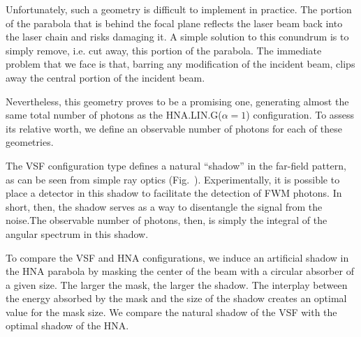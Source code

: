 \documentclass[11pt,SymmetricalJury]{inrsthesis/inrsthesis}
\begin{document}
Unfortunately, such a geometry is difficult to implement in practice. The portion
of the parabola that is behind the focal plane reflects the laser beam back
into the laser chain and risks damaging it. A simple solution to this conundrum
is to simply remove, i.e. cut away, this portion of the parabola. The immediate
problem that we face is that, barring any modification of the incident beam,
clips away the central portion of the incident beam.

Nevertheless, this geometry proves to be a promising one, generating almost
the same total number of photons as the HNA.LIN.G($\alpha=1$) configuration.
To assess its relative worth, we define an observable number of photons
for each of these geometries.

The VSF configuration type defines a natural ``shadow'' in the far-field
pattern, as can be seen from simple ray optics (Fig.~{}). Experimentally, it is
possible to place a detector in this shadow to facilitate the detection of FWM
photons. In short, then, the shadow serves as a way to disentangle the signal
from the noise.The observable number of photons, then, is simply the integral of
the angular spectrum in this shadow.

To compare the VSF and HNA configurations, we induce an artificial shadow in
the HNA parabola by masking the center of the beam with a circular absorber
of a given size. The larger the mask, the larger the shadow. The interplay
between the energy absorbed by the mask and the size of the shadow creates
an optimal value for the mask size. We compare the natural shadow of the VSF
with the optimal shadow of the HNA.


\renewcommand{\chart}[1]{
  \ChartBox{#1}{0.22\textwidth/6.09*#1}{phd_orange}}

\end{document}
